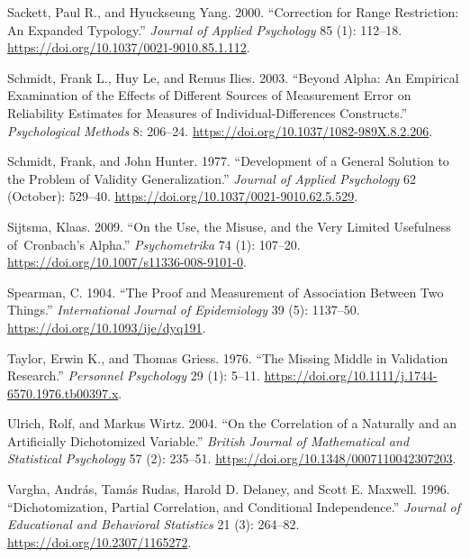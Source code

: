 \documentclass[
  letterpaper,
  DIV=11,
  numbers=noendperiod]{scrreprt}
\newlength{\cslhangindent}
\newlength{\cslentryspacingunit} %
\newenvironment{CSLReferences}[2] %
 {%
  \setlength{\parindent}{0pt}
  \ifodd #1
  \let\oldpar\par
  \def\par{\hangindent=\cslhangindent\oldpar}
  \fi
  \setlength{\parskip}{#2\cslentryspacingunit}
 }%
 {}
\begin{document}
\begin{CSLReferences}{1}{0}
\leavevmode{}%
Sackett, Paul R., and Hyuckseung Yang. 2000. {``Correction for Range
Restriction: An Expanded Typology.''} \emph{Journal of Applied
Psychology} 85 (1): 112--18.
\url{https://doi.org/10.1037/0021-9010.85.1.112}.

\leavevmode{}%
Schmidt, Frank L., Huy Le, and Remus Ilies. 2003. {``Beyond Alpha: An
Empirical Examination of the Effects of Different Sources of Measurement
Error on Reliability Estimates for Measures of Individual-Differences
Constructs.''} \emph{Psychological Methods} 8: 206--24.
\url{https://doi.org/10.1037/1082-989X.8.2.206}.

\leavevmode{}%
Schmidt, Frank, and John Hunter. 1977. {``Development of a General
Solution to the Problem of Validity Generalization.''} \emph{Journal of
Applied Psychology} 62 (October): 529--40.
\url{https://doi.org/10.1037/0021-9010.62.5.529}.

\leavevmode{}%
Sijtsma, Klaas. 2009. {``On the Use, the Misuse, and the Very Limited
Usefulness of~Cronbach{'}s Alpha.''} \emph{Psychometrika} 74 (1):
107--20. \url{https://doi.org/10.1007/s11336-008-9101-0}.

\leavevmode{}%
Spearman, C. 1904. {``The Proof and Measurement of Association Between
Two Things.''} \emph{International Journal of Epidemiology} 39 (5):
1137--50. \url{https://doi.org/10.1093/ije/dyq191}.

\leavevmode{}%
Taylor, Erwin K., and Thomas Griess. 1976. {``The Missing Middle in
Validation Research.''} \emph{Personnel Psychology} 29 (1): 5--11.
\url{https://doi.org/10.1111/j.1744-6570.1976.tb00397.x}.

\leavevmode{}%
Ulrich, Rolf, and Markus Wirtz. 2004. {``On the Correlation of a
Naturally and an Artificially Dichotomized Variable.''} \emph{British
Journal of Mathematical and Statistical Psychology} 57 (2): 235--51.
\url{https://doi.org/10.1348/0007110042307203}.

\leavevmode{}%
Vargha, András, Tamás Rudas, Harold D. Delaney, and Scott E. Maxwell.
1996. {``Dichotomization, Partial Correlation, and Conditional
Independence.''} \emph{Journal of Educational and Behavioral Statistics}
21 (3): 264--82. \url{https://doi.org/10.2307/1165272}.


\end{CSLReferences}
\end{document}
